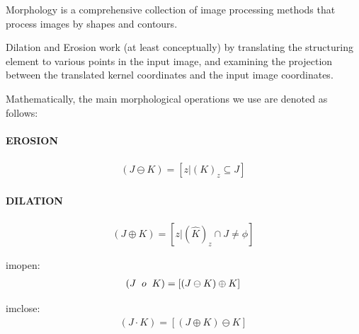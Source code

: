 \documentclass[conference]{IEEEtran}
\begin{document}
Morphology is a comprehensive collection of image processing methods that process images by shapes and contours.

Dilation and Erosion work (at least conceptually) by translating the structuring element to various points in the input image, and examining the projection between the translated kernel coordinates and the input image coordinates.

Mathematically, the main morphological operations we use are denoted as follows:

\paragraph{EROSION}
\begin{equation}
\begin{aligned}
\left(J \ominus K\right) = \left[z|(K)_z\subseteq J \right]\,
\end{aligned}
\end{equation}


\paragraph{DILATION}
\begin{equation}
\begin{aligned}
\left(J \oplus K\right) =  \left[z|(\widehat{K})_z\cap J \neq \phi \right]\,
\end{aligned}
\end{equation}

imopen:
\begin{equation}
\begin{aligned}
\left(J \hspace{2mm} o\hspace{2mm} K\right) =  \left[\left(J \ominus K \right) \oplus K \right]\,
\end{aligned}
\end{equation}

imclose:
\begin{equation}
\begin{aligned}
\left(J  \cdot  K\right) =  \left[\left(J \oplus K \right) \ominus K \right]\,
\end{aligned}
\end{equation}
\end{document}

